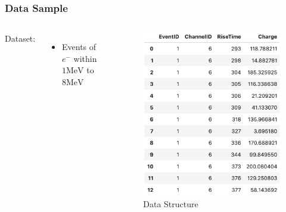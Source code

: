\documentclass{beamer}
\newcommand{\mev}{\mathrm{MeV}}
\begin{document}
\begin{frame}
\frametitle{Data Sample}
\begin{columns}
\hspace{4mm}Dataset:
\begin{itemize}
    \item Events of $e^{-}$ within $1\mev$ to $8\mev$
\end{itemize}
\begin{figure}
    \centering
    \caption{Data Structure}
    \includegraphics[width=1.0\linewidth]{img/dataset.png}
\end{figure}
\end{columns}
\end{frame}
\end{document}
